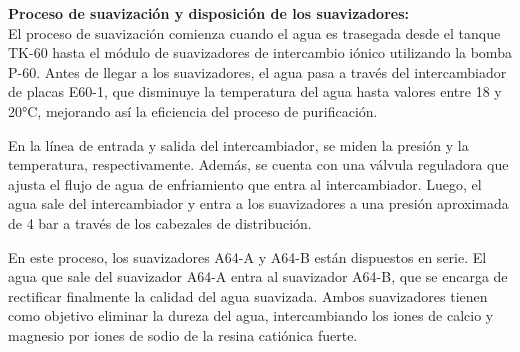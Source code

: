 
\textbf{Proceso de suavización y disposición de los suavizadores:}\\
El proceso de suavización comienza cuando el agua es trasegada desde el tanque TK-60 hasta el módulo de suavizadores de intercambio iónico utilizando la bomba P-60. Antes de llegar a los suavizadores, el agua pasa a través del intercambiador de placas E60-1, que disminuye la temperatura del agua hasta valores entre 18 y 20°C, mejorando así la eficiencia del proceso de purificación.

En la línea de entrada y salida del intercambiador, se miden la presión y la temperatura, respectivamente. Además, se cuenta con una válvula reguladora que ajusta el flujo de agua de enfriamiento que entra al intercambiador. Luego, el agua sale del intercambiador y entra a los suavizadores a una presión aproximada de 4 bar a través de los cabezales de distribución.

En este proceso, los suavizadores A64-A y A64-B están dispuestos en serie. El agua que sale del suavizador A64-A entra al suavizador A64-B, que se encarga de rectificar finalmente la calidad del agua suavizada. Ambos suavizadores tienen como objetivo eliminar la dureza del agua, intercambiando los iones de calcio y magnesio por iones de sodio de la resina catiónica fuerte.

